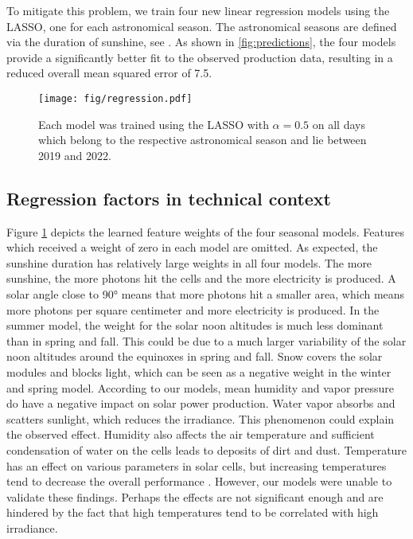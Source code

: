 \documentclass{article}
\begin{document}
To mitigate this problem, we train four new linear regression models using the LASSO, one for each astronomical season. The astronomical seasons are defined via the duration of sunshine, see \cite{MS}. As shown in \ref{fig:predictions}, the four models provide a significantly better fit to the observed production data, resulting in a reduced overall mean squared error of 7.5.

\begin{figure}
	\texttt{[image: fig/regression.pdf]}
	\caption{Each model was trained using the LASSO with $\alpha = 0.5$ on all days which belong to the respective astronomical season and lie between 2019 and 2022.}\label{fig:coefficients}
\end{figure}

\subsection*{Regression factors in technical context}

Figure \ref{fig:coefficients} depicts the learned feature weights of the four seasonal models. Features which received a weight of zero in each model are omitted. As expected, the sunshine duration has relatively large weights in all four models. The more sunshine, the more photons hit the cells and the more electricity is produced. A solar angle close to 90° means that more photons hit a smaller area, which means more photons per square centimeter and more electricity is produced. In the summer model, the weight for the solar noon altitudes is much less dominant than in spring and fall. This could be due to a much larger variability of the solar noon altitudes around the equinoxes in spring and fall. Snow covers the solar modules and blocks light, which can be seen as a negative weight in the winter and spring model. According to our models, mean humidity and vapor pressure do have a negative impact on solar power production. Water vapor absorbs and scatters sunlight, which reduces the irradiance. This phenomenon could explain the observed effect. Humidity also affects the air temperature and sufficient condensation of water on the cells leads to deposits of dirt and dust. Temperature has an effect on various parameters in solar cells, but increasing temperatures tend to decrease the overall performance \cite{SolarAndTemperature}. However, our models were unable to validate these findings. Perhaps the effects are not significant enough and are hindered by the fact that high temperatures tend to be correlated with high irradiance.
\end{document}
